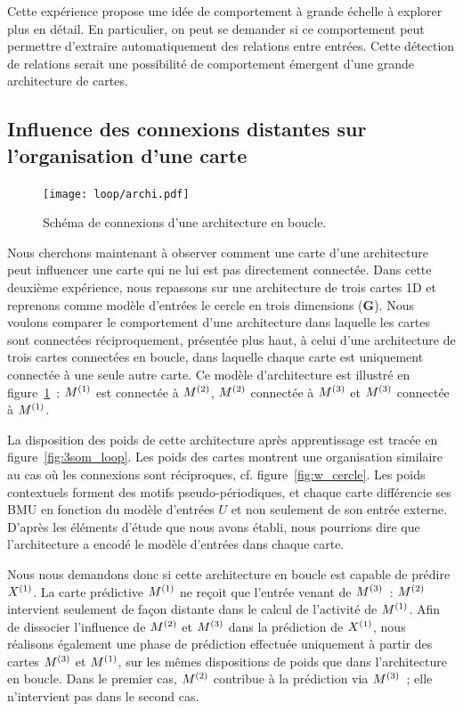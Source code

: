 \documentclass[../main]{subfiles}
\begin{document}
Cette expérience propose une idée de comportement à grande échelle à explorer plus en détail.
En particulier, on peut se demander si ce comportement peut permettre d'extraire automatiquement des relations entre entrées. Cette détection de relations serait une possibilité de comportement émergent d'une grande architecture de cartes.

\subsection{Influence des connexions distantes sur l'organisation d'une carte}
\begin{figure}
	\centering\texttt{[image: loop/archi.pdf]}
	\caption{Schéma de connexions d'une architecture en \og boucle\fg{}. \label{fig:archi_loop}}
\end{figure}

Nous cherchons maintenant à observer comment une carte d'une architecture peut influencer une carte qui ne lui est pas directement connectée.
Dans cette deuxième expérience, nous repassons sur une architecture de trois cartes 1D et reprenons comme modèle d'entrées le cercle en trois dimensions (\textbf{G}). 
Nous voulons comparer le comportement d'une architecture dans laquelle les cartes sont connectées réciproquement, présentée plus haut, à celui d'une architecture de trois cartes connectées en boucle, dans laquelle chaque carte est uniquement connectée à une seule autre carte. 
Ce modèle d'architecture est illustré en figure~\ref{fig:archi_loop}~: $M^{({1})}$ est connectée à $M^{({2})}$, $M^{({2})}$ connectée à $M^{({3})}$ et $M^{({3})}$ connectée à $M^{({1})}$.

La disposition des poids de cette architecture après apprentissage est tracée en figure~\ref{fig:3som_loop}.
Les poids des cartes montrent une organisation similaire au cas où les connexions sont réciproques, cf. figure~\ref{fig:w_cercle}. Les poids contextuels forment des motifs pseudo-périodiques, et chaque carte différencie ses BMU en fonction du modèle d'entrées $U$ et non seulement de son entrée externe.
D'après les éléments d'étude que nous avons établi, nous pourrions dire que l'architecture a encodé le modèle d'entrées dans chaque carte.

Nous nous demandons donc si cette architecture en boucle est capable de prédire $X^{({1})}$. 
La carte prédictive $M^{({1})}$ ne reçoit que l'entrée venant de $M^{({3})}$~: $M^{({2})}$ intervient seulement de façon distante dans le calcul de l'activité de $M^{({1})}$.
Afin de dissocier l'influence de $M^{({2})}$ et $M^{({3})}$ dans la prédiction de $X^{({1})}$, nous réalisons également une phase de prédiction effectuée uniquement à partir des cartes $M^{({3})}$ et $M^{({1})}$, sur les mêmes dispositions de poids que dans l'architecture en boucle. 
Dans le premier cas, $M^{({2})}$ contribue à la prédiction via $M^{({3})}$~; elle n'intervient pas dans le second cas.
\end{document}
